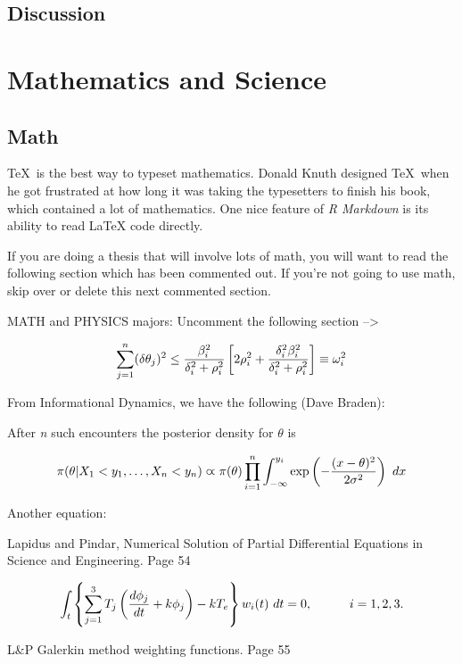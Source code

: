 \documentclass[ms]{uncgdissertationexp}
\theoremstyle{plain}
\theoremstyle{definition}
\theoremstyle{remark}
\begin{document}
  \section{Discussion}\label{discussion}
  
  \chapter{Mathematics and Science}\label{math-sci}
  
  \section*{Math}\label{Math}
  
  \TeX~is the best way to typeset mathematics. Donald Knuth designed
  \TeX~when he got frustrated at how long it was taking the typesetters to
  finish his book, which contained a lot of mathematics. One nice feature
  of \emph{R Markdown} is its ability to read LaTeX code directly.
  
  If you are doing a thesis that will involve lots of math, you will want
  to read the following section which has been commented out. If you're
  not going to use math, skip over or delete this next commented section.
  
  MATH and PHYSICS majors: Uncomment the following section
  --\textgreater{}
  
  \[\sum_{j=1}^n (\delta\theta_j)^2 \leq {{\beta_i^2}\over{\delta_i^2 + \rho_i^2}}
  \left[ 2\rho_i^2 + {\delta_i^2\beta_i^2\over{\delta_i^2 + \rho_i^2}} \right] \equiv \omega_i^2
  \]
  
  From Informational Dynamics, we have the following (Dave Braden):
  
  After \emph{n} such encounters the posterior density for \(\theta\) is
  
  \[
  \pi(\theta\vert X_1< y_1,\dots,X_n<y_n) \varpropto \pi(\theta) \prod_{i=1}^n\int_{-\infty}^{y_i}
     \exp\left(-{(x-\theta)^2\over{2\sigma^2}}\right)\ dx
  \]
  
  Another equation:
  
  Lapidus and Pindar, Numerical Solution of Partial Differential Equations
  in Science and Engineering. Page 54
  
  \[
  \int_t\left\{\sum_{j=1}^3 T_j \left({d\phi_j\over dt}+k\phi_j\right)-kT_e\right\}w_i(t)\ dt=0,
     \qquad\quad i=1,2,3.
  \]
  
  L\&P Galerkin method weighting functions. Page 55
  
\end{document}
